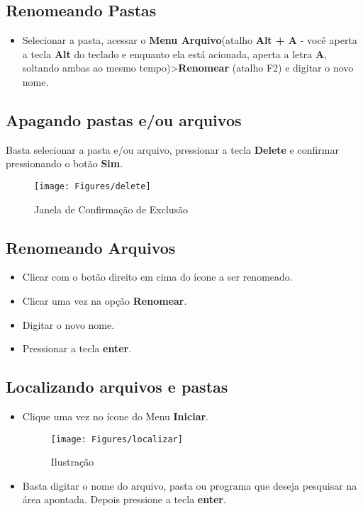 \documentclass[12pt]{article}
\begin{document}
		\subsection{Renomeando Pastas}
		
		\begin{itemize}
			\item Selecionar a pasta, acessar o {\bf Menu Arquivo}(atalho {\bf Alt + A} - você aperta a tecla {\bf Alt} do teclado e enquanto ela está acionada, aperta a letra {\bf A}, soltando ambas ao mesmo tempo)>{\bf Renomear} (atalho F2) e digitar o novo nome.
		\end{itemize}
		
		\subsection{Apagando pastas e/ou arquivos}
		
		Basta selecionar a pasta e/ou arquivo, pressionar a tecla {\bf Delete} e confirmar pressionando o botão {\bf Sim}.
		
			\begin{figure}[!h]
				\centering
				\texttt{[image: Figures/delete]}
				\caption{Janela de Confirmação de Exclusão}
				\label{fig:delete}
			\end{figure}
		
		\subsection{Renomeando Arquivos}
		
		\begin{itemize}
			\item Clicar com o botão direito em cima do ícone a ser renomeado.
			\item Clicar uma vez na opção {\bf Renomear}.
			\item Digitar o novo nome.
			\item Pressionar a tecla {\bf enter}.
		\end{itemize}
		
		\subsection{Localizando arquivos e pastas}
		
		\begin{itemize}
			\item Clique uma vez no ícone do Menu {\bf Iniciar}.
			
			\begin{figure}[!h]
				\centering
				\texttt{[image: Figures/localizar]}
				\caption{Ilustração}
				\label{fig:localizar}
			\end{figure}
			
			\item  Basta digitar o nome do arquivo, pasta ou programa que deseja pesquisar na área apontada. Depois pressione a tecla {\bf enter}.
		\end{itemize}
		
\end{document}
